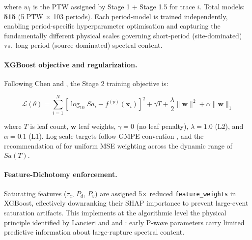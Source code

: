 \documentclass[10pt]{article}
\renewcommand{\cite}[1]{\citep{#1}}
\begin{document}
where \(w_i\) is the PTW assigned by Stage 1 + Stage 1.5 for trace \(i\). Total models: \textbf{515} (5 PTW × 103 periods). Each period-model is trained independently, enabling period-specific hyperparameter optimisation and capturing the fundamentally different physical scales governing short-period (site-dominated) vs.~long-period (source-dominated) spectral content.

\paragraph{XGBoost objective and regularization.} Following Chen and \citet{ref36}, the Stage 2 training objective is:

\[\mathcal{L}(\theta) = \sum_{i=1}^{N} \left[\log_{10}Sa_i - f^{(p)}(\mathbf{x}_i)\right]^2 + \gamma T + \frac{\lambda}{2}\|\mathbf{w}\|^2 + \alpha\|\mathbf{w}\|_1\]

where \(T\) is leaf count, \(\mathbf{w}\) leaf weights, \(\gamma = 0\) (no leaf penalty), \(\lambda = 1.0\) (L2), and \(\alpha = 0.1\) (L1). Log-scale targets follow GMPE convention \cite{ref48}, \cite{ref62} and the recommendation of \citet{ref35} for uniform MSE weighting across the dynamic range of \(Sa(T)\).

\paragraph{Feature-Dichotomy enforcement.} Saturating features (\(\tau_c\), \(P_d\), \(P_v\)) are assigned 5× reduced \texttt{feature\_weights} in XGBoost, effectively downranking their SHAP importance to prevent large-event saturation artifacts. This implements at the algorithmic level the physical principle identified by Lancieri and \citet{ref24} and \citet{ref26}: early P-wave parameters carry limited predictive information about large-rupture spectral content.
\end{document}
